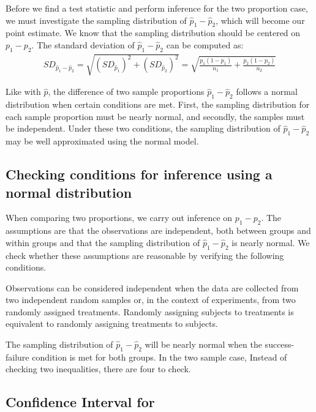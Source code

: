 Before we find a test statistic and perform inference for the two proportion case, we must investigate the sampling distribution of $\hat{p}_1-\hat{p}_2$, which will become our point estimate.  We know that the sampling distribution should be centered on $p_1-p_2$.  The standard deviation of $\hat{p}_1-\hat{p}_2$ can be computed as:
\begin{align*}
SD_{\hat{p}_1 - \hat{p}_2}
	= \sqrt{(SD_{\hat{p}_1})^2 + (SD_{\hat{p}_2})^2} 
	= \sqrt{\frac{p_1(1-p_1)}{n_1} + \frac{p_2(1-p_2)}{n_2}}
\end{align*}

Like with $\hat{p}$, the difference of two sample proportions $\hat{p}_1-\hat{p}_2$ follows a normal distribution when certain conditions are met.  First, the sampling distribution for each sample proportion must be nearly normal, and secondly, the samples must be independent. Under these two conditions, the sampling distribution of $\hat{p}_1 - \hat{p}_2$ may be well approximated using the normal model.


\subsection{Checking conditions for inference using a normal distribution}
When comparing two proportions, we carry out inference on $p_1-p_2$.  The assumptions are that the observations are independent, both between groups and within groups and that the sampling distribution of $\hat{p}_1-\hat{p}_2$ is nearly normal.  We check whether these assumptions are reasonable by verifying the following conditions.
\begin{description}
\setlength{\itemsep}{0mm}
\item[Independent.] Observations can be considered independent when the data are collected from two independent random samples or, in the context of experiments, from two randomly assigned treatments.  Randomly assigning subjects to treatments is equivalent to randomly assigning treatments to subjects.  
\item[Nearly normal sampling distribution.] The sampling distribution of $\hat{p}_1-\hat{p}_2$ will be nearly normal when the success-failure condition is met for both groups.  In the two sample case, Instead of checking two inequalities, there are four to check.
\end{description}



\subsection[Confidence Interval for $p_1 -p_2$]{Confidence Interval for }

